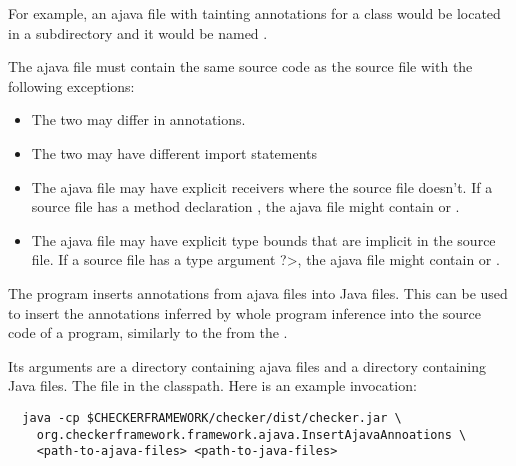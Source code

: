 For example, an ajava file with
tainting annotations for a class  would
be located in a subdirectory  and it would be
named
.



The
ajava file must contain the same source code as the source file with the following exceptions:
\begin{itemize}
  \item The two may differ in annotations.
  \item The two may have different import statements
  \item The ajava file may have explicit receivers where the source file
    doesn't. If a source file has a method declaration , the ajava file might contain  or .
  \item The ajava file may have explicit type bounds that are implicit in the source file.
    If a source file has a type argument \<?>,
    the ajava file might contain  or .
\end{itemize}



The  program inserts annotations
from ajava files into Java files.  This can be used to
insert the annotations inferred by whole program inference into the source code
of a program, similarly to the
 from the
.

Its arguments are a directory containing ajava files and a directory
containing Java files.  The  file in the classpath.  Here
is an example invocation:
\begin{Verbatim}
  java -cp $CHECKERFRAMEWORK/checker/dist/checker.jar \
    org.checkerframework.framework.ajava.InsertAjavaAnnoations \
    <path-to-ajava-files> <path-to-java-files>
\end{Verbatim}



